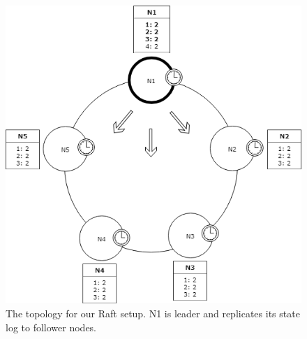 \begin{figure}[H]
	\centering
	\includegraphics[scale=0.4]{faultTolerance/fig/Raft.png}
	\caption{The topology for our Raft setup. N1 is leader and replicates its state log to follower nodes.}
	\label{fig:raft}
\end{figure}
